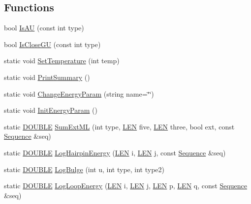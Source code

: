 \subsection*{Functions}
\begin{DoxyCompactItemize}
\item 
bool \hyperlink{namespace_rfold_1_1_parameter_a82faf0dc317bb70000edd3f34bc467b9}{Is\+A\+U} (const int type)
\item 
bool \hyperlink{namespace_rfold_1_1_parameter_a0ed77a73e79acb5e23fbb8f0a93e915f}{Is\+Close\+G\+U} (const int type)
\item 
static void \hyperlink{namespace_rfold_1_1_parameter_a308e1549312d4c50c9701331ef6acf7e}{Set\+Temperature} (int temp)
\item 
static void \hyperlink{namespace_rfold_1_1_parameter_af2fc6f49adcbd2c489ef4afa27c096dc}{Print\+Summary} ()
\item 
static void \hyperlink{namespace_rfold_1_1_parameter_a5d691fc3fd4d8c3633b25eb48ab151d0}{Change\+Energy\+Param} (string name=\char`\"{}\char`\"{})
\item 
static void \hyperlink{namespace_rfold_1_1_parameter_a3c977c57f1a40be353e62f7292eff9e4}{Init\+Energy\+Param} ()
\item 
static \hyperlink{energy__const_8hh_a8747af38b86aa2bbcda2f1b1aa0888c2}{D\+O\+U\+B\+L\+E} \hyperlink{namespace_rfold_1_1_parameter_a56e65afc08cd0ac6ec2af3a0bac07c0d}{Sum\+Ext\+M\+L} (int type, \hyperlink{energy__const_8hh_a05b49c662c073f89e86804f7856622a0}{L\+E\+N} five, \hyperlink{energy__const_8hh_a05b49c662c073f89e86804f7856622a0}{L\+E\+N} three, bool ext, const \hyperlink{class_rfold_1_1_parameter_1_1_sequence}{Sequence} \&seq)
\item 
static \hyperlink{energy__const_8hh_a8747af38b86aa2bbcda2f1b1aa0888c2}{D\+O\+U\+B\+L\+E} \hyperlink{namespace_rfold_1_1_parameter_a59afd89fc8f4ec5e7fa0ef0a3e56f302}{Log\+Hairpin\+Energy} (\hyperlink{energy__const_8hh_a05b49c662c073f89e86804f7856622a0}{L\+E\+N} i, \hyperlink{energy__const_8hh_a05b49c662c073f89e86804f7856622a0}{L\+E\+N} j, const \hyperlink{class_rfold_1_1_parameter_1_1_sequence}{Sequence} \&seq)
\item 
static \hyperlink{energy__const_8hh_a8747af38b86aa2bbcda2f1b1aa0888c2}{D\+O\+U\+B\+L\+E} \hyperlink{namespace_rfold_1_1_parameter_a84c12e24c819863c0a7de43605f07053}{Log\+Bulge} (int u, int type, int type2)
\item 
static \hyperlink{energy__const_8hh_a8747af38b86aa2bbcda2f1b1aa0888c2}{D\+O\+U\+B\+L\+E} \hyperlink{namespace_rfold_1_1_parameter_a1c0e2f8427cf288a00fc615429933918}{Log\+Loop\+Energy} (\hyperlink{energy__const_8hh_a05b49c662c073f89e86804f7856622a0}{L\+E\+N} i, \hyperlink{energy__const_8hh_a05b49c662c073f89e86804f7856622a0}{L\+E\+N} j, \hyperlink{energy__const_8hh_a05b49c662c073f89e86804f7856622a0}{L\+E\+N} p, \hyperlink{energy__const_8hh_a05b49c662c073f89e86804f7856622a0}{L\+E\+N} q, const \hyperlink{class_rfold_1_1_parameter_1_1_sequence}{Sequence} \&seq)

\end{DoxyCompactItemize}
